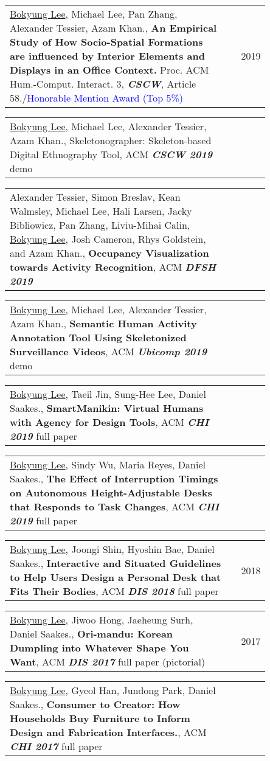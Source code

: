 \documentclass[letterpaper,11pt]{article} %
\makeatletter
\newcommand{\CVPub}[2]{
  \vspace{-2pt}\item
    \begin{tabular*}{0.97\textwidth}[t]{p{0.85\linewidth}@{\extracolsep{\fill}}r}
      \small#1 & #2 \\
    \end{tabular*}\vspace{-7pt}
}
\makeatother
\begin{document}
    \CVPub
      {\underline{Bokyung Lee}, Michael Lee, Pan Zhang, Alexander Tessier, Azam Khan., \textbf{An Empirical Study of How Socio-Spatial Formations are influenced by Interior Elements and Displays in an Office Context.} Proc. ACM Hum.-Comput. Interact. 3, \textbf{\textit{CSCW}}, Article 58./\textcolor{blue}{Honorable Mention Award (Top 5\%)}}{2019}
    
    \CVPub
      {\underline{Bokyung Lee}, Michael Lee, Alexander Tessier, Azam Khan., Skeletonographer: Skeleton-based Digital Ethnography Tool, ACM \textbf{\textit{CSCW 2019}} demo}{}
      
    \CVPub
      {Alexander Tessier, Simon Breslav, Kean Walmsley, Michael Lee, Hali Larsen, Jacky Bibliowicz, Pan Zhang, Liviu-Mihai Calin, \underline{Bokyung Lee}, Josh Cameron, Rhys Goldstein, and Azam Khan., \textbf{Occupancy Visualization towards Activity Recognition}, ACM \textbf{\textit{DFSH 2019}}}{}
      
    \CVPub
      {\underline{Bokyung Lee}, Michael Lee, Alexander Tessier, Azam Khan., \textbf{Semantic Human Activity Annotation Tool Using Skeletonized Surveillance Videos}, ACM \textbf{\textit{Ubicomp 2019}} demo}{}
      
    \CVPub
      {\underline{Bokyung Lee}, Taeil Jin, Sung-Hee Lee, Daniel Saakes., \textbf{SmartManikin: Virtual Humans with Agency for Design Tools}, ACM \textbf{\textit{CHI 2019}} full paper}{}
      
    \CVPub
      {\underline{Bokyung Lee}, Sindy Wu, Maria Reyes, Daniel Saakes., \textbf{The Effect of Interruption Timings on Autonomous Height-Adjustable Desks that Responds to Task Changes}, ACM \textbf{\textit{CHI 2019}} full paper}{}

    \CVPub
      {\underline{Bokyung Lee}, Joongi Shin, Hyoshin Bae, Daniel Saakes., \textbf{Interactive and Situated Guidelines to Help Users Design a Personal Desk that Fits Their Bodies}, ACM \textbf{\textit{DIS 2018}} full paper}{2018}
      
    \CVPub
      {\underline{Bokyung Lee}, Jiwoo Hong, Jaeheung Surh, Daniel Saakes., \textbf{Ori-mandu: Korean Dumpling into Whatever Shape You Want}, ACM \textbf{\textit{DIS 2017}} full paper (pictorial)}{2017}
      
    \CVPub
      {\underline{Bokyung Lee}, Gyeol Han, Jundong Park, Daniel Saakes., \textbf{Consumer to Creator: How Households Buy Furniture to Inform Design and Fabrication Interfaces.}, ACM \textbf{\textit{CHI 2017}} full paper}{}
      
\end{document}
